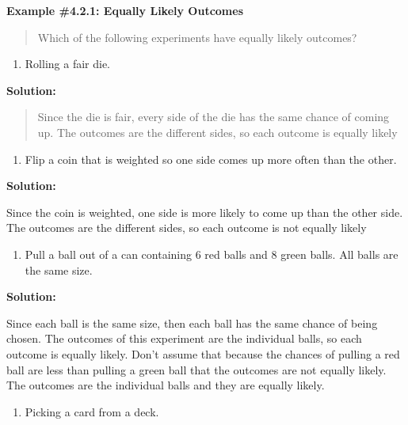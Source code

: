 \documentclass[]{book}
\providecommand{\tightlist}{%
  \setlength{\itemsep}{0pt}\setlength{\parskip}{0pt}}
\begin{document}
\textbf{Example \#4.2.1: Equally Likely Outcomes}

\begin{quote}
Which of the following experiments have equally likely outcomes?
\end{quote}

\begin{enumerate}
\def\labelenumi{\alph{enumi}.}
\tightlist
\item
  Rolling a fair die.
\end{enumerate}

\textbf{Solution:}

\begin{quote}
Since the die is fair, every side of the die has the same chance of
coming up. The outcomes are the different sides, so each outcome is
equally likely
\end{quote}

\begin{enumerate}
\def\labelenumi{\alph{enumi}.}
\setcounter{enumi}{1}
\tightlist
\item
  Flip a coin that is weighted so one side comes up more often than
  the other.
\end{enumerate}

\textbf{Solution:}

Since the coin is weighted, one side is more likely to come up than
the other side. The outcomes are the different sides, so each
outcome is not equally likely

\begin{enumerate}
\def\labelenumi{\alph{enumi}.}
\setcounter{enumi}{2}
\tightlist
\item
  Pull a ball out of a can containing 6 red balls and 8 green balls.
  All balls are the same size.
\end{enumerate}

\textbf{Solution:}

Since each ball is the same size, then each ball has the same chance
of being chosen. The outcomes of this experiment are the individual
balls, so each outcome is equally likely. Don't assume that because
the chances of pulling a red ball are less than pulling a green ball
that the outcomes are not equally likely. The outcomes are the
individual balls and they are equally likely.

\begin{enumerate}
\def\labelenumi{\alph{enumi}.}
\setcounter{enumi}{3}
\tightlist
\item
  Picking a card from a deck.
\end{enumerate}
\end{document}
